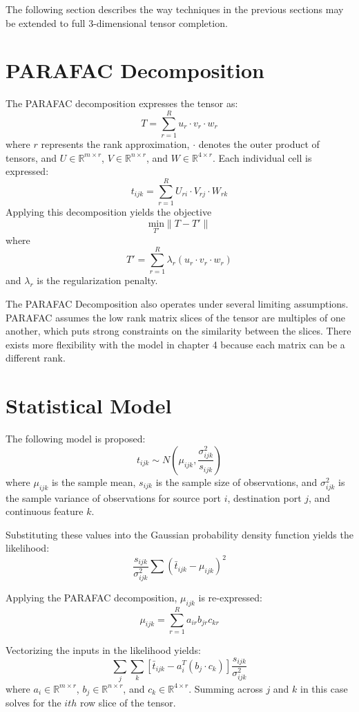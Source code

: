 \documentclass[12pt,twoside]{dukestatscithesis}
\theoremstyle{definition}
\theoremstyle{definition}
\theoremstyle{definition}
\theoremstyle{remark}
\begin{document}
The following section describes the way techniques in the previous
sections may be extended to full 3-dimensional tensor completion.

\section{PARAFAC Decomposition}\label{parafac-decomposition}

The PARAFAC decomposition expresses the tensor as:
\[T = \sum_{r=1}^Ru_r \cdotp v_r \cdotp w_r\] where \(r\) represents the
rank approximation, \(\cdotp\) denotes the outer product of tensors, and
\(U \in \mathbb{R}^{m \times r}\), \(V \in \mathbb{R}^{n \times r}\),
and \(W \in \mathbb{R}^{4 \times r}\). Each individual cell is
expressed: \[t_{ijk} = \sum_{r=1}^RU_{ri} \cdotp V_{rj} \cdotp W_{rk}\]
Applying this decomposition yields the objective
\[\underset{T'} {\text{min}}\|T-T'\|\] where
\[T' = \sum_{r=1}^R\lambda_r(u_r \cdotp v_r \cdotp w_r)\] and
\(\lambda_r\) is the regularization penalty.

The PARAFAC Decomposition also operates under several limiting
assumptions. PARAFAC assumes the low rank matrix slices of the tensor
are multiples of one another, which puts strong constraints on the
similarity between the slices. There exists more flexibility with the
model in chapter 4 because each matrix can be a different rank.

\section{Statistical Model}\label{statistical-model}

The following model is proposed:
\[t_{ijk} \sim N(\mu_{ijk}, \frac{\sigma^2_{ijk}}{s_{ijk}})\] where
\(\mu_{ijk}\) is the sample mean, \(s_{ijk}\) is the sample size of
observations, and \(\sigma^2_{ijk}\) is the sample variance of
observations for source port \(i\), destination port \(j\), and
continuous feature \(k\).

Substituting these values into the Gaussian probability density function
yields the likelihood:
\[\frac{s_{ijk}}{\sigma^2_{ijk}}\sum(\bar t_{ijk} - \mu_{ijk})^2\]

Applying the PARAFAC decomposition, \(\mu_{ijk}\) is re-expressed:
\[\mu_{ijk} = \sum_{r=1}^Ra_{ir}b_{jr}c_{kr}\]

Vectorizing the inputs in the likelihood yields:
\[\sum_j\sum_k[\bar t_{ijk} - a_i^T(b_j \cdotp c_k)]\frac{s_{ijk}}{\sigma^2_{ijk}}\]
where \(a_i \in \mathbb{R}^{m \times r}\),
\(b_j \in \mathbb{R}^{n \times r}\), and
\(c_k \in \mathbb{R}^{4 \times r}\). Summing across \(j\) and \(k\) in
this case solves for the \(ith\) row slice of the tensor.
\end{document}
